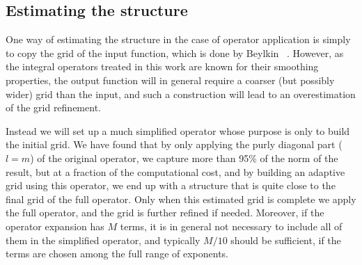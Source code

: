 \subsection{Estimating the \tree structure}
One way of estimating the \tree structure in the case of operator application 
is simply to copy the grid of the input function, which is done by Beylkin 
\etal~\cite{Beylkin:2008p37}. However, as the integral
operators treated in this work are known for their smoothing properties, the
output function will in general require a coarser (but possibly wider) grid 
than the input, and such a construction will lead to an overestimation of the 
grid refinement. 

Instead we 
will set up a much simplified operator whose purpose is only to build the initial 
grid. We have found that by only applying the purly diagonal part ($l = m$) 
of the original operator, we capture more than 95\% of the norm of the result, 
but at a fraction of the computational cost, and by building an adaptive grid using
this operator, we end up with a \tree structure that is quite close to the final 
grid of the full operator. Only when this estimated grid is complete we apply the
full operator, and the grid is further refined if needed. Moreover, if the operator
expansion has $M$ terms, it is in general not necessary to include all of
them in the simplified operator, and typically $M/10$ should be sufficient,
if the terms are chosen among the full range of exponents.
